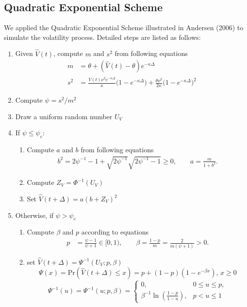 \documentclass{ws-ijfe}
\begin{document}
\subsection{Quadratic Exponential Scheme}
We applied the Quadratic Exponential Scheme illustrated in Andersen (2006) \cite{Andersen} to simulate the volatility process. Detailed steps are listed as follows:
\begin{enumerate}
\item Given $\hat{V}(t)$, compute $m$ and $s^2$ from following equations
\begin{align*}
  m &=\theta + (\hat{V}(t)-\theta)e^{-\kappa\Delta} \\
  s^2 &=\frac{\hat{V}(t)\nu^2 e^{-\kappa\Delta}}{\kappa}\bigg(1-e^{-\kappa\Delta}\bigg)+\frac{\theta\nu^2}{2\kappa}\bigg(1-e^{-\kappa\Delta}\bigg)^2
\end{align*}
\item Compute $\psi=s^2/m^2$\\
\item Draw a uniform random number $U_V$
\item If $\psi\leq\psi_c$:
\begin{enumerate}
\item Compute $a$ and $b$ from following equations
\begin{align*}
b^2=2\psi^{-1}-1+\sqrt{2\psi^{-1}}\sqrt{2\psi^{-1}-1}\geq 0, \qquad a =\frac{m}{1+b^2}.
\end{align*}
\item Compute $Z_V=\Phi^{-1}(U_V)$
\item Set $\hat{V}(t+\Delta)=a(b+Z_V)^2$
\end{enumerate}
\item Otherwise, if $\psi>\psi_c$
\begin{enumerate}
  \item Compute $\beta$ and $p$ according to equations
  \begin{align*}
    p & =\frac{\psi-1}{\psi+1}\in[0,1), \qquad%
    \beta =\frac{1-p}{m}=\frac{2}{m(\psi+1)}>0.
  \end{align*}
  \item set $\hat{V}(t+\Delta)=\Psi^{-1}(U_V;p,\beta)$
  \begin{equation*}
    \Psi(x) = \text{Pr}(\hat{V}(t+\Delta)\leq x) = p+(1-p)(1-e^{-\beta x}),\, x\geq 0
  \end{equation*}
  \[
  \Psi^{-1}(u)=\Psi^{-1}(u;p,\beta)=
  \begin{cases}
    0,\,&0\leq u \leq p,\\
    \beta^{-1}\ln(\frac{1-p}{1-u}),&p<u\leq1
  \end{cases}
  \]
\end{enumerate}
\end{enumerate}
\end{document}
